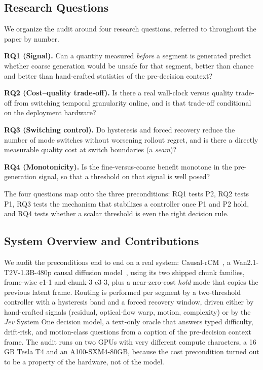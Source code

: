 \documentclass[journal]{IEEEtran}
\newcommand{\cfine}{\textup{c1-1}}
\newcommand{\ccoarse}{\textup{c3-3}}
\begin{document}
\subsection{Research Questions}
We organize the audit around four research questions, referred to throughout the paper by number.

\textbf{RQ1 (Signal).} Can a quantity measured \emph{before} a segment is generated predict whether coarse generation would be unsafe for that segment, better than chance and better than hand-crafted statistics of the pre-decision context?

\textbf{RQ2 (Cost--quality trade-off).} Is there a real wall-clock versus quality trade-off from switching temporal granularity online, and is that trade-off conditional on the deployment hardware?

\textbf{RQ3 (Switching control).} Do hysteresis and forced recovery reduce the number of mode switches without worsening rollout regret, and is there a directly measurable quality cost at switch boundaries (a \emph{seam})?

\textbf{RQ4 (Monotonicity).} Is the fine-versus-coarse benefit monotone in the pre-generation signal, so that a threshold on that signal is well posed?

The four questions map onto the three preconditions: RQ1 tests P2, RQ2 tests P1, RQ3 tests the mechanism that stabilizes a controller once P1 and P2 hold, and RQ4 tests whether a scalar threshold is even the right decision rule.

\subsection{System Overview and Contributions}
We audit the preconditions end to end on a real system: Causal-rCM~\cite{zhengCausalrCMUnifiedTeacherForcing2026}, a Wan2.1-T2V-1.3B-480p causal diffusion model~\cite{wan2025wan}, using its two shipped chunk families, frame-wise \cfine{} and chunk-3 \ccoarse, plus a near-zero-cost \emph{hold} mode that copies the previous latent frame. Routing is performed per segment by a two-threshold controller with a hysteresis band and a forced recovery window, driven either by hand-crafted signals (residual, optical-flow warp, motion, complexity) or by the \emph{Jev} System One decision model, a text-only oracle that answers typed difficulty, drift-risk, and motion-class questions from a caption of the pre-decision context frame. The audit runs on two GPUs with very different compute characters, a 16\,GB Tesla T4 and an A100-SXM4-80GB, because the cost precondition turned out to be a property of the hardware, not of the model.
\end{document}
